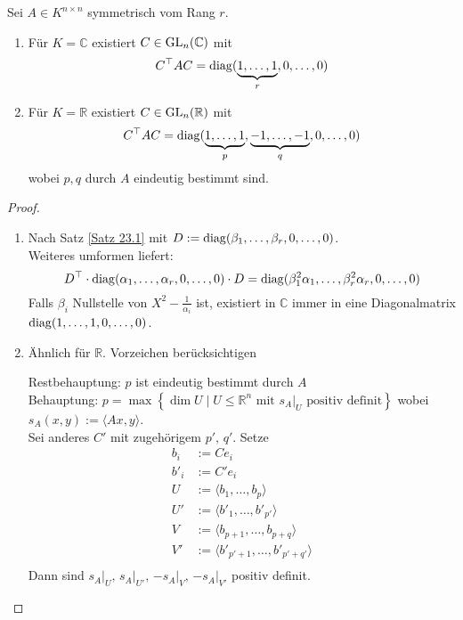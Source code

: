 \documentclass[parskip,a4paper,twoside,DIV15,BCOR12mm]{scrbook}
\begin{document}
\begin{theo}
\label{Satz 23.2}
Sei \(A\in K^{n\times n}\) symmetrisch vom Rang \(r\).
\begin{enumerate}
\item Für \(K=\mathbb{C}\) existiert \(C\in\operatorname{GL}_{n}(\mathbb{C})\) mit
\[
C^{\top}AC=\operatorname{diag}(\underbrace{1,\ldots,1}_{r},0,\ldots,0)
\]
\item Für \(K=\mathbb{R}\) existiert \(C\in\operatorname{GL}_{n}(\mathbb{R})\) mit
\[
C^{\top}AC=\operatorname{diag}(\underbrace{1,\ldots,1}_{p},\underbrace{-1,\ldots,-1}_{q},0,\ldots,0)
\]
wobei \(p,q\) durch \(A\) eindeutig bestimmt sind.
\end{enumerate}
\end{theo}
\begin{proof}
\begin{enumerate}
\item Nach Satz \ref{Satz 23.1} mit \(D:=\operatorname{diag}(\beta_{1},\ldots,\beta_{r},0,\ldots,0)\).\\
Weiteres umformen liefert:
\[
D^{\top}\cdot\operatorname{diag}(\alpha_{1},\ldots,\alpha_{r},0,\ldots,0)\cdot D=
\operatorname{diag}(\beta_{1}^{2}\alpha_{1},\ldots,\beta_{r}^{2}\alpha_{r},0,\ldots,0)
\]
Falls \(\beta_{i}\) Nullstelle von \(X^{2}-\frac{1}{\alpha_{i}}\) ist, existiert
in \(\mathbb{C}\) immer in eine Diagonalmatrix \(\operatorname{diag}(1,\ldots,1,0,\ldots,0)\).
\item Ähnlich für \(\mathbb{R}\). Vorzeichen berücksichtigen

Restbehauptung: \(p\) ist eindeutig bestimmt durch \(A\)\\
Behauptung: \(p=\max\left\{\dim U\mid U\leq\mathbb{R}^{n}\text{ mit } \left.
s_{A}\right|_{U}\text{ positiv definit}\right\}\) wobei 
\(s_{A}(x,y):=\langle Ax,y\rangle\).\\
Sei anderes \(C'\) mit zugehörigem \(p',\,q'\). Setze
\begin{align*}
b_{i}&:=Ce_{i}\\
b'_{i}&:=C'e_{i}\\
U&:=\langle b_{1},\ldots,b_{p}\rangle\\
U'&:=\langle b'_{1},\ldots,b'_{p'}\rangle\\
V&:=\langle b_{p+1},\ldots,b_{p+q}\rangle\\
V'&:=\langle b'_{p'+1},\ldots,b'_{p'+q'}\rangle\\
\end{align*}
Dann sind \(\left.s_{A}\right|_{U},\,\left.s_{A}\right|_{U'},\,\left.-s_{A}\right|_{V},\,\left.-s_{A}\right|_{V'}\) positiv definit.


\end{enumerate}
\end{proof}
\end{document}
